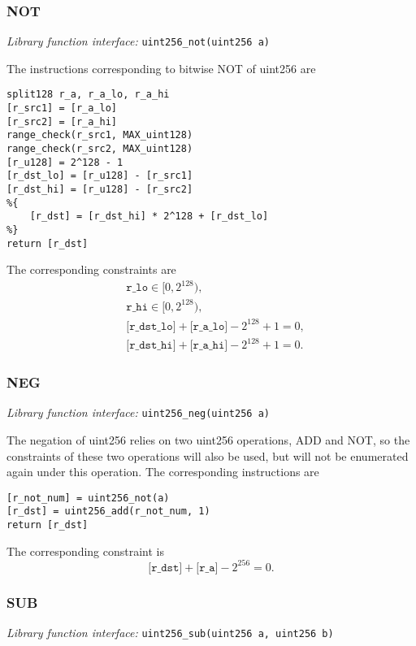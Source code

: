 \subsubsection{NOT}

\emph{Library function interface:} \verb|uint256_not(uint256 a)|

The instructions corresponding to bitwise NOT of uint256 are
\begin{lstlisting}[language={}]
split128 r_a, r_a_lo, r_a_hi
[r_src1] = [r_a_lo]
[r_src2] = [r_a_hi]
range_check(r_src1, MAX_uint128)
range_check(r_src2, MAX_uint128)
[r_u128] = 2^128 - 1
[r_dst_lo] = [r_u128] - [r_src1]
[r_dst_hi] = [r_u128] - [r_src2]
%{
    [r_dst] = [r_dst_hi] * 2^128 + [r_dst_lo]
%}
return [r_dst]
\end{lstlisting}

The corresponding constraints are
\begin{align*}
    & \texttt{r\_lo} \in [0, 2^{128}), \\
    & \texttt{r\_hi} \in [0, 2^{128}), \\
    & \texttt{[r\_dst\_lo]} + \texttt{[r\_a\_lo]} - 2^{128} + 1 = 0, \\
    & \texttt{[r\_dst\_hi]} + \texttt{[r\_a\_hi]} - 2^{128} + 1 = 0.
\end{align*}

\subsubsection{NEG}

\emph{Library function interface:} \verb|uint256_neg(uint256 a)|

The negation of uint256 relies on two uint256 operations, ADD and NOT, so the constraints of these two operations will also be used, but will not be enumerated again under this operation.
The corresponding instructions are
\begin{lstlisting}[language={}]
[r_not_num] = uint256_not(a)
[r_dst] = uint256_add(r_not_num, 1)
return [r_dst]
\end{lstlisting}

The corresponding constraint is
\[ \texttt{[r\_dst]} + \texttt{[r\_a]} - 2^{256} = 0. \]

\subsubsection{SUB}

\emph{Library function interface:} \verb|uint256_sub(uint256 a, uint256 b)|

